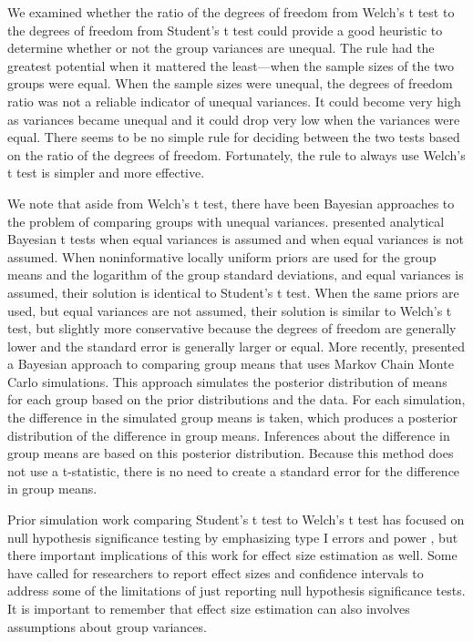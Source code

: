 \documentclass[man,a4paper,noextraspace,apacite]{apa6}
\begin{document}
    We examined whether the ratio of the degrees of freedom from Welch's t test 
to the degrees of freedom from Student's t test could provide a good heuristic 
to determine whether or not the group variances are unequal. The rule had the 
greatest potential when it mattered the least---when the sample sizes of the 
two groups were equal. When the sample sizes were unequal, the degrees of 
freedom ratio was not a reliable indicator of unequal variances. It could 
become very high as variances became unequal and it could drop very low when 
the variances were equal. There seems to be no simple rule for deciding between 
the two tests based on the ratio of the degrees of freedom. Fortunately, the 
rule to always use Welch's t test is simpler and more effective.
    
    We note that aside from Welch's t test, there have been Bayesian approaches 
to the problem of comparing groups with unequal variances. 
 presented analytical Bayesian t tests when equal 
variances is assumed and when equal variances is not assumed. When 
noninformative locally uniform priors are used for the group means and the 
logarithm of the group standard deviations, and equal variances is assumed, 
their solution is identical to Student's t test. When the same priors are used, 
but equal variances are not assumed, their solution is similar to Welch's t 
test, but slightly more conservative because the degrees of freedom are 
generally lower and the standard error is generally larger or equal. More 
recently,  presented a Bayesian approach to comparing group 
means that uses Markov Chain Monte Carlo simulations. This approach simulates 
the posterior distribution of means for each group based on the prior 
distributions and the data. For each simulation, the difference in the 
simulated group means is taken, which produces a posterior distribution of the 
difference in group means. Inferences about the difference in group means are 
based on this posterior distribution. Because this method does not use a 
t-statistic, there is no need to create a standard error for the difference in 
group means. 
    
    Prior simulation work comparing Student's t test to Welch's t test has 
focused on null hypothesis significance testing by emphasizing type I errors 
and power \cite{Boneau1960, Neuhauser2002, Zimmerman1993, Zimmerman2004, 
Zimmerman1996, Zimmerman2009}, but there important implications of this work 
for effect size estimation as well. Some have called for researchers to report 
effect sizes and confidence intervals to address some of the limitations of 
just reporting null hypothesis significance tests. It is important to remember 
that effect size estimation can also involves assumptions about group variances.
    
\end{document}
